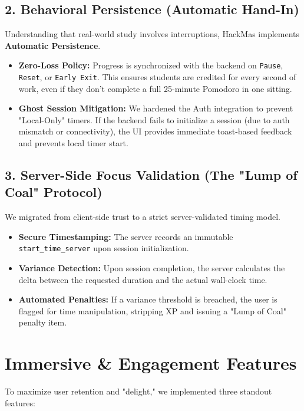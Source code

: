 \documentclass[12pt,a4paper]{article}
\begin{document}
\subsection{2. Behavioral Persistence (Automatic Hand-In)}
Understanding that real-world study involves interruptions, HackMas implements \textbf{Automatic Persistence}.
\begin{itemize}
    \item \textbf{Zero-Loss Policy:} Progress is synchronized with the backend on \texttt{Pause}, \texttt{Reset}, or \texttt{Early Exit}. This ensures students are credited for every second of work, even if they don't complete a full 25-minute Pomodoro in one sitting.
    \item \textbf{Ghost Session Mitigation:} We hardened the Auth integration to prevent "Local-Only" timers. If the backend fails to initialize a session (due to auth mismatch or connectivity), the UI provides immediate toast-based feedback and prevents local timer start.
\end{itemize}

\subsection{3. Server-Side Focus Validation (The "Lump of Coal" Protocol)}
We migrated from client-side trust to a strict server-validated timing model.
\begin{itemize}
    \item \textbf{Secure Timestamping:} The server records an immutable \texttt{start\_time\_server} upon session initialization.
    \item \textbf{Variance Detection:} Upon session completion, the server calculates the delta between the requested duration and the actual wall-clock time.
    \item \textbf{Automated Penalties:} If a variance threshold is breached, the user is flagged for time manipulation, stripping XP and issuing a "Lump of Coal" penalty item.
\end{itemize}

\section{Immersive \& Engagement Features}
To maximize user retention and "delight," we implemented three standout features:
\end{document}
